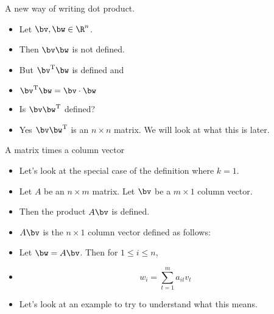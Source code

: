 \documentclass{beamer}
\begin{document}

\begin{frame}{A new way of writing dot product.}

\begin{itemize}
\item Let $\bv,\bw \in \R^n$.
\item Then $\bv \bw$ is not defined.
\item But $\bv^{\text{T}} \bw$ is defined and
\item  $\bv^{\text{T}} \bw = \bv \cdot \bw$
\item Is $\bv \bw^{\text{T}}$ defined?
\item Yes $\bv \bw^{\text{T}}$ is an $n\times n$ matrix. We will look
at what this is later.
\end{itemize}

\end{frame}


\begin{frame}{A matrix times a column vector}

\begin{itemize}
\item Let's look at the special case of the  definition where $k=1$.
\item Let $A$ be an $n\times m$ matrix. Let $\bv$ be a $m\times 1$ column vector.
\item Then the product $A \bv$ is defined.
\item $A \bv$ is the $n\times 1$ column vector defined as follows:
\item Let $\bw=A \bv$. Then for $1\leq i \leq n$,
\item $$w_i = \sum_{t=1}^m a_{it} v_{t}$$
\item Let's look at an example to try to understand what this means.
\end{itemize}

\end{frame}

\end{document}

